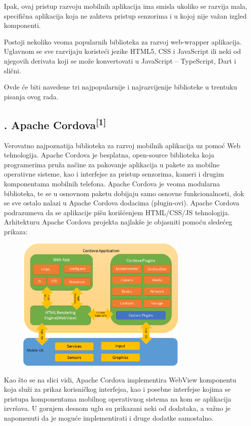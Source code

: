\documentclass[a4paper]{article}
\begin{document}
Ipak, ovaj pristup razvoju mobilnih aplikacija ima smisla ukoliko se
razvija mala, specifična aplikacija koja ne zahteva pristup senzorima i
u kojoj nije važan izgled komponenti. 

Postoji nekoliko veoma popularnih biblioteka za razvoj web-wrapper
aplikacija. Uglavnom se sve razvijaju koristeći jezike HTML5, CSS i
JavaScript ili neki od njegovih derivata koji se može konvertovati u
JavaScript – TypeScript, Dart i slični.

Ovde će biti navedene tri najpopularnije i najrazvijenije biblioteke u
trentuku pisanja ovog rada.

\subsection[2.1. Apache Cordova[1{]}]{. Apache
Cordova\textsuperscript{[1]}}
\hypertarget{RefHeadingToc1151308303690}{}Verovatno najpoznatija
biblioteka za razvoj mobilnih aplikacija uz pomoć Web tehnologija.
Apache Cordova je besplatna, open-source biblioteka koja programerima
pruža načine za pakovanje aplikacija u pakete za mobilne operativne
sisteme, kao i interfejse za pristup senzorima, kameri i drugim
komponentama mobilnih telefona. Apache Cordova je veoma modularna
biblioteka, te se u osnovnom paketu dobijaju samo osnovne
funkcionalnosti, dok se sve ostalo nalazi u Apache Cordova dodacima
(plugin-ovi). Apache Cordova podrazumeva da se aplikacije pišu
korišćenjem HTML/CSS/JS tehnologija. Arhitekturu Apache Cordova
projekta najlakše je objasniti pomoću sledećeg prikaza:



\begin{figure}
\centering
\includegraphics[width=83.82mm,height=66.3mm]{msc-img3.png}
\end{figure}
Kao što se na slici vidi, Apache Cordova implementira WebView komponentu
koja služi za prikaz korisničkog interfejsa, kao i posebne interfejse
kojima se pristupa komponentama mobilnog operativnog sistema na kom se
aplikacija izvršava. U gornjem desnom uglu su prikazani neki od
dodataka, a važno je napomenuti da je moguće implementirati i druge
dodatke samostalno.
\end{document}

